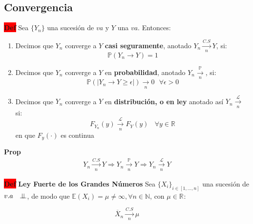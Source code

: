 \documentclass[letterpaper,10.5pt,twocolumn]{article} %
\newcommand{\R}[1][]{\mathbb{R}^{#1}}
\newcommand{\N}{\mathbb{N} }
\newcommand{\E}{\mathbb{E} }
\newcommand{\Proba}{\mathbb{P} }
\newcommand{\hlc}[2][yellow]{ \colorbox{#1}{#2} }
\newcommand{\Prop}{\hlc[amber]{\bfseries Prop}}
\newcommand{\Def}{\hlc[red]{\bfseries Def}}
\newcommand{\independent}{\perp\mkern-9.5mu\perp}
\begin{document}
\subsection{Convergencia}
\Def Sea $\{Y_n \}$ una sucesión de $va$ y $Y$ una $va$. Entonces:
\begin{enumerate}[label={(\textit{\roman*})}, leftmargin=*, itemsep=0pt]
    \item Decimos que $Y_{n}$ converge a $Y$ \textbf{casi seguramente}, anotado $Y_n  \xrightarrow[\ n\ ]{C.S} Y$, si:
    \begin{equation*}
        \Proba (Y_n \rightarrow Y) = 1
    \end{equation*}
    \item Decimos que $Y_{n}$ converge a $Y $ en \textbf{probabilidad}, anotado $Y_n \xrightarrow[n]{\Proba} $, si:
    \begin{equation*}
        \Proba (|Y_n \rightarrow Y \geq \epsilon|) \xrightarrow[\ n\ ]{} 0 \ \ \ \forall\epsilon>0
    \end{equation*}
    \item Decimos que $Y_{n}$ converge a $Y$ en \textbf{distribución, o en ley} anotado así $Y_n \xrightarrow[\ n\ ]{\mathcal{L}} $ si:
    \begin{equation*}
        F_{Y_n} (y) \xrightarrow[\ n\ ]{\mathcal{L}} F_Y (y)\ \ \ \ \forall y\in \R 
    \end{equation*}
    en que $F_{y}(\cdot)$ es continua
\end{enumerate}

\Prop \begin{equation*}
\boxed{
\begin{split}
Y_n \xrightarrow[\ n\ ]{C.S} Y \Rightarrow Y_n \xrightarrow[\ n\ ]{\Proba} Y \Rightarrow Y_n \xrightarrow[n]{\mathcal{L}} Y
\end{split}
}
\end{equation*}

\Def \textbf{Ley Fuerte de los Grandes Números} Sea $\{X_i\}_{i\in [1,\ldots,n]}$ una sucesión de $v.a\ \ \independent $, de modo que $\E(X_i) = \mu \neq \infty,\forall n \in \N$, con $\mu \in \R$:

\begin{equation*}
    \overline{X}_n \xrightarrow[\ n\ ]{C.S} \mu 
\end{equation*}
\end{document}
